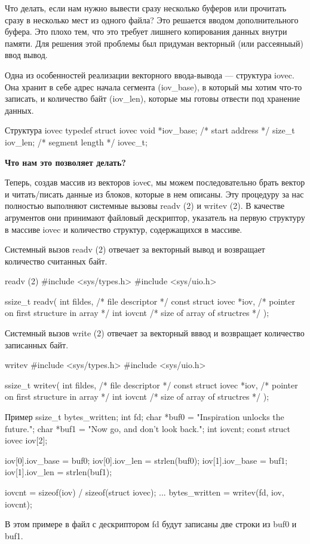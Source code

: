 Что делать, если нам нужно вывести сразу несколько буферов или прочитать сразу в несколько мест из одного файла? Это решается вводом дополнительного буфера. Это плохо тем, что это требует лишнего копирования данных внутри памяти. Для решения этой проблемы был придуман векторный (или рассеяныый) ввод вывод.

Одна из особенностей реализации векторного ввода-вывода --- структура iovec. Она хранит в себе адрес начала сегмента (iov\_base), в который мы хотим что-то записать, и количество байт (iov\_len), которые мы готовы отвести под хранение данных.

\begin{CCode}{Структура iovec}
	typedef struct iovec { 
		void *iov_base;  	/* start address */ 
		size_t iov_len; 	/* segment length */ 
	} iovec_t; \end{CCode}

\textbf{Что нам это позволяет делать?}

Теперь, создав массив из векторов ioveс, мы можем последовательно брать вектор и читать/писать данные из блоков, которые в нем описаны.
Эту процедуру за нас полностью выполняют системные вызовы readv (2) и writev (2). В качестве агрументов они принимают файловый дескриптор, указатель на первую структуру в массиве iovec и количество структур, содержащихся в массиве. 

Системный вызов readv (2) отвечает за векторный вывод и возвращает количество считанных байт.

\begin{CCode}{readv (2)}
	#include <sys/types.h>
	#include <sys/uio.h>

	ssize_t readv(
		int fildes, 				/* file descriptor */ 
		const struct iovec *iov, 	/* pointer on first structure in array */ 
		int iovcnt 					/* size of array of structres */ 
	); \end{CCode}

Системный вызов write (2) отвечает за векторный вввод и возвращает количество записанных байт.

\begin{CCode}{writev}
	#include <sys/types.h>
	#include <sys/uio.h>

	ssize_t writev(
		int fildes, 				/* file descriptor */ 
		const struct iovec *iov, 	/* pointer on first structure in array */ 
		int iovcnt 					/* size of array of structres */ 
	); \end{CCode}

\begin{CCode}{Пример}
	ssize_t bytes_written;
	int fd;
	char *buf0 = "Inspiration unlocks the future.\n";
	char *buf1 = "Now go, and don't look back.\n";
	int iovcnt;
	const struct iovec iov[2];

	iov[0].iov_base = buf0;
	iov[0].iov_len = strlen(buf0);
	iov[1].iov_base = buf1;
	iov[1].iov_len = strlen(buf1);
	
	iovcnt = sizeof(iov) / sizeof(struct iovec);
		...
	bytes_written = writev(fd, iov, iovcnt); \end{CCode}

В этом примере в файл с дескриптором fd будут записаны две строки из buf0 и buf1.
